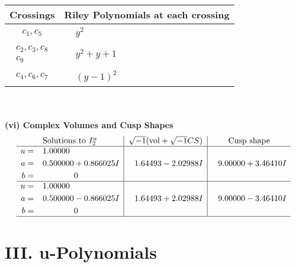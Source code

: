 \documentclass[1p]{elsarticle_modified}
\theoremstyle{definition}
\newcommand{\I}{\sqrt{-1}}
\begin{document}
\begin{tabular}{m{50pt}|m{274pt}}
Crossings & \hspace{64pt}Riley Polynomials at each crossing \\
\hline $$\begin{aligned}c_{1},c_{5}\end{aligned}$$&$\begin{aligned}
&y^2
\end{aligned}$\\
\hline $$\begin{aligned}c_{2},c_{3},c_{8}\\c_{9}\end{aligned}$$&$\begin{aligned}
&y^2+y+1
\end{aligned}$\\
\hline $$\begin{aligned}c_{4},c_{6},c_{7}\end{aligned}$$&$\begin{aligned}
&(y-1)^2
\end{aligned}$\\
\hline
\end{tabular}\\~\\
\newpage\flushleft \textbf{(vi) Complex Volumes and Cusp Shapes}
$$\begin{array}{c|c|c}  
\text{Solutions to }I^u_{2}& \I (\text{vol} + \sqrt{-1}CS) & \text{Cusp shape}\\
 \hline 
\begin{aligned}
u &= \phantom{-}1.00000\phantom{ +0.000000I} \\
a &= \phantom{-}0.500000 + 0.866025 I \\
b &= \phantom{-0.000000 } 0\end{aligned}
 & \phantom{-}1.64493 - 2.02988 I & \phantom{-}9.00000 + 3.46410 I \\ \hline\begin{aligned}
u &= \phantom{-}1.00000\phantom{ +0.000000I} \\
a &= \phantom{-}0.500000 - 0.866025 I \\
b &= \phantom{-0.000000 } 0\end{aligned}
 & \phantom{-}1.64493 + 2.02988 I & \phantom{-}9.00000 - 3.46410 I\\
 \hline 
 \end{array}$$\newpage
\newpage\renewcommand{\arraystretch}{1}
\centering \section*{ III. u-Polynomials}
\end{document}
